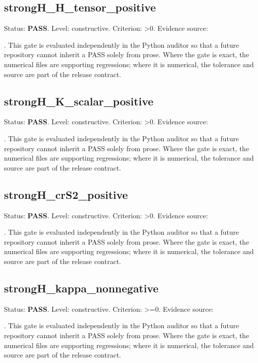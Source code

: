 \documentclass[11pt,a4paper,oneside]{book}
\begin{document}
\subsection{strongH\_H\_tensor\_positive}
Status: \textbf{PASS}. Level: constructive. Criterion: >0. Evidence source:\par\noindent{}. This gate is evaluated independently in the Python auditor so that a future repository cannot inherit a PASS solely from prose. Where the gate is exact, the numerical files are supporting regressions; where it is numerical, the tolerance and source are part of the release contract.\par

\subsection{strongH\_K\_scalar\_positive}
Status: \textbf{PASS}. Level: constructive. Criterion: >0. Evidence source:\par\noindent{}. This gate is evaluated independently in the Python auditor so that a future repository cannot inherit a PASS solely from prose. Where the gate is exact, the numerical files are supporting regressions; where it is numerical, the tolerance and source are part of the release contract.\par

\subsection{strongH\_crS2\_positive}
Status: \textbf{PASS}. Level: constructive. Criterion: >0. Evidence source:\par\noindent{}. This gate is evaluated independently in the Python auditor so that a future repository cannot inherit a PASS solely from prose. Where the gate is exact, the numerical files are supporting regressions; where it is numerical, the tolerance and source are part of the release contract.\par

\subsection{strongH\_kappa\_nonnegative}
Status: \textbf{PASS}. Level: constructive. Criterion: >=0. Evidence source:\par\noindent{}. This gate is evaluated independently in the Python auditor so that a future repository cannot inherit a PASS solely from prose. Where the gate is exact, the numerical files are supporting regressions; where it is numerical, the tolerance and source are part of the release contract.\par
\end{document}
